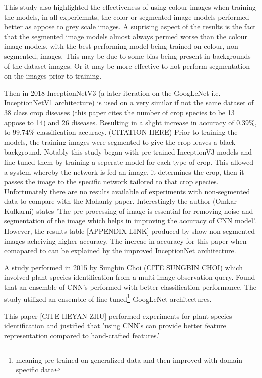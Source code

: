   This study also highlighted the effectiveness of using colour images when training the models, in all experiemnts, the color or segmented image models performed better as appose to grey scale images. A suprising aspect of the results is the fact that the segmented image models almost always permed worse than the colour image models, with the best performing model being trained on colour, non-segmented, images. This may be due to some bias being present in backgrounds of the dataset images. Or it may be more effective to not perform segmentation on the images prior to training.
  \par
  Then in 2018 InceptionNetV3 (a later iteration on the GoogLeNet i.e. InceptionNetV1 architecture) is used on a very similar if not the same dataset of 38 class crop diseases (this paper cites the number of crop species to be 13 appose to 14) and 26 diseases. Resulting in a slight increase in accuracy of 0.39\%, to 99.74\% classification accuracy. (CITATION HERE) %
  Prior to training the models, the training images were segmented to give the crop leaves a black background.
  Notably this study began with pre-trained InceptionV3 models and fine tuned them by training a seperate model for each type of crop. This allowed a system whereby the network is fed an image, it determines the crop, then it passes the image to the specific network tailored to that crop species.
  Unfortunately there are no results available of experiments with non-segmented data to compare with the Mohanty paper. Interestingly the author (Omkar Kulkarni) states 'The pre-processing of image is essential for removing noise and segmentation of the image which helps in improving the accuracy of CNN model'. However, the results table [APPENDIX LINK] produced by \cite{Mohanty2016} show non-segmented images acheiving higher accuracy. The increae in accuracy for this paper when comapared to \cite{Mohanty2016} can be explained by the improved InceptionNet architecture.
  \par
  A study performed in 2015 by Sungbin Choi (CITE SUNGBIN CHOI) which involved plant species identification from a multi-image observation query. Found that an ensemble of CNN's performed with better classification performance. The study utilized an ensemble of fine-tuned\footnote[2]{meaning pre-trained on generalized data and then improved with domain specific data} GoogLeNet architectures.
  \par
  This paper [CITE HEYAN ZHU] performed experiments for plant species identification and justified that 'using CNN's can provide better feature representation compared to hand-crafted features.'
